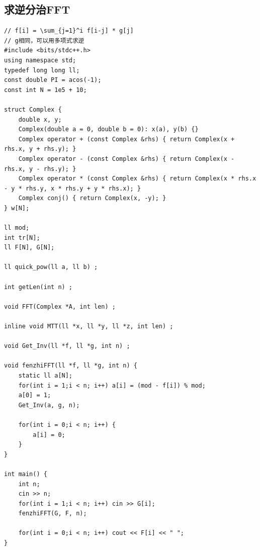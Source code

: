 \documentclass[twoside]{article}
\begin{document}
\subsection{求逆分治FFT}
\begin{lstlisting}
// f[i] = \sum_{j=1}^i f[i-j] * g[j]
// g相同，可以用多项式求逆
#include <bits/stdc++.h>
using namespace std;
typedef long long ll;
const double PI = acos(-1);
const int N = 1e5 + 10;

struct Complex {
    double x, y;
    Complex(double a = 0, double b = 0): x(a), y(b) {}
    Complex operator + (const Complex &rhs) { return Complex(x + rhs.x, y + rhs.y); }
    Complex operator - (const Complex &rhs) { return Complex(x - rhs.x, y - rhs.y); }
    Complex operator * (const Complex &rhs) { return Complex(x * rhs.x - y * rhs.y, x * rhs.y + y * rhs.x); }
    Complex conj() { return Complex(x, -y); }
} w[N];

ll mod;
int tr[N];
ll F[N], G[N];

ll quick_pow(ll a, ll b) ;

int getLen(int n) ;

void FFT(Complex *A, int len) ;

inline void MTT(ll *x, ll *y, ll *z, int len) ;

void Get_Inv(ll *f, ll *g, int n) ;

void fenzhiFFT(ll *f, ll *g, int n) {
    static ll a[N];
    for(int i = 1;i < n; i++) a[i] = (mod - f[i]) % mod;
    a[0] = 1;
    Get_Inv(a, g, n);

    for(int i = 0;i < n; i++) {
        a[i] = 0;
    }
}

int main() {
    int n;
    cin >> n;
    for(int i = 1;i < n; i++) cin >> G[i];
    fenzhiFFT(G, F, n);
    
    for(int i = 0;i < n; i++) cout << F[i] << " ";
}\end{lstlisting}
\end{document}
